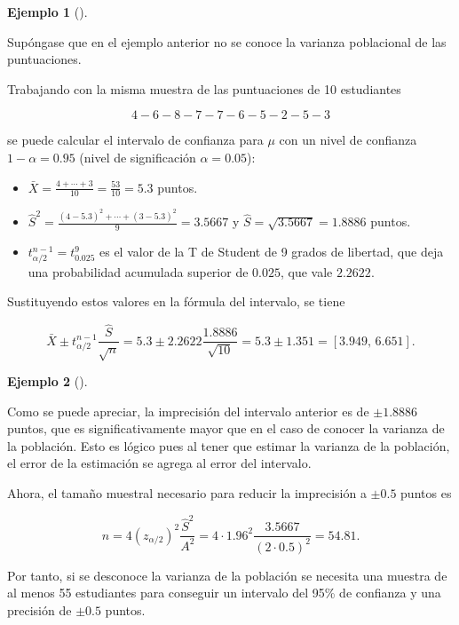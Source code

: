 \documentclass[
  a4paper,
]{scrreport}
\providecommand{\tightlist}{%
  \setlength{\itemsep}{0pt}\setlength{\parskip}{0pt}}\usepackage{longtable,booktabs,array}
\theoremstyle{plain}
\theoremstyle{definition}
\newtheorem{example}{Ejemplo}[chapter]
\theoremstyle{definition}
\theoremstyle{remark}
\begin{document}
\begin{example}[]\protect\hypertarget{exm-intervalo-confianza-media-normal-varianza-desconocida}{}\label{exm-intervalo-confianza-media-normal-varianza-desconocida}

Supóngase que en el ejemplo anterior no se conoce la varianza
poblacional de las puntuaciones.

Trabajando con la misma muestra de las puntuaciones de 10 estudiantes

\[
4 - 6 - 8 - 7 - 7 - 6 - 5 - 2 - 5 - 3
\]

se puede calcular el intervalo de confianza para \(\mu\) con un nivel de
confianza \(1-\alpha=0.95\) (nivel de significación \(\alpha=0.05\)):

\begin{itemize}
\tightlist
\item
  \(\bar X = \frac{4+\cdots+3}{10}= \frac{53}{10} = 5.3\) puntos.
\item
  \(\hat{S}^2= \frac{(4-5.3)^2+\cdots+(3-5.3)^2}{9} = 3.5667\) y
  \(\hat{S}=\sqrt{3.5667}=1.8886\) puntos.
\item
  \(t^{n-1}_{\alpha/2}=t^9_{0.025}\) es el valor de la T de Student de 9
  grados de libertad, que deja una probabilidad acumulada superior de
  \(0.025\), que vale \(2.2622\).
\end{itemize}

Sustituyendo estos valores en la fórmula del intervalo, se tiene

\[
\bar{X}\pm t^{n-1}_{\alpha/2}\frac{\hat{S}}{\sqrt{n}} = 5.3\pm 2.2622\frac{1.8886}{\sqrt{10}} = 5.3\pm 1.351 = \left[3.949,\,6.651\right].
\]

\end{example}

\begin{example}[]\protect\hypertarget{exm-tamaño-muestral-ntervalo-confianza-media-normal-varianza-desconocida}{}\label{exm-tamaño-muestral-ntervalo-confianza-media-normal-varianza-desconocida}

Como se puede apreciar, la imprecisión del intervalo anterior es de
\(\pm 1.8886\) puntos, que es significativamente mayor que en el caso de
conocer la varianza de la población. Esto es lógico pues al tener que
estimar la varianza de la población, el error de la estimación se agrega
al error del intervalo.

Ahora, el tamaño muestral necesario para reducir la imprecisión a
\(\pm 0.5\) puntos es

\[
n = 4 (z_{\alpha/2})^2\frac{\hat{S}^2}{A^2} = 4\cdot 1.96^2\frac{3.5667}{(2\cdot 0.5)^2} = 54.81.
\]

Por tanto, si se desconoce la varianza de la población se necesita una
muestra de al menos 55 estudiantes para conseguir un intervalo del 95\%
de confianza y una precisión de \(\pm 0.5\) puntos.

\end{example}
\end{document}
